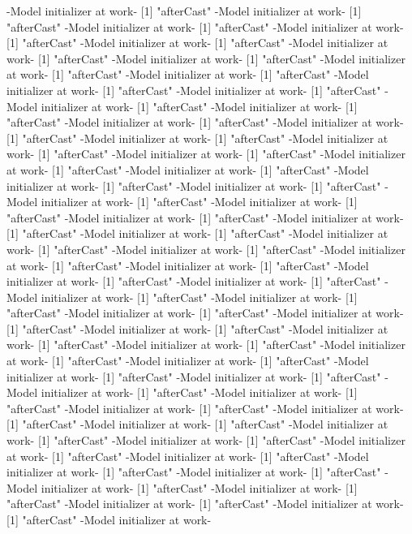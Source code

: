 \documentclass[a4paper]{article}
\begin{document}
\begin{Schunk}
\begin{Soutput}
-Model initializer at work-
[1] "afterCast"
-Model initializer at work-
[1] "afterCast"
-Model initializer at work-
[1] "afterCast"
-Model initializer at work-
[1] "afterCast"
-Model initializer at work-
[1] "afterCast"
-Model initializer at work-
[1] "afterCast"
-Model initializer at work-
[1] "afterCast"
-Model initializer at work-
[1] "afterCast"
-Model initializer at work-
[1] "afterCast"
-Model initializer at work-
[1] "afterCast"
-Model initializer at work-
[1] "afterCast"
-Model initializer at work-
[1] "afterCast"
-Model initializer at work-
[1] "afterCast"
-Model initializer at work-
[1] "afterCast"
-Model initializer at work-
[1] "afterCast"
-Model initializer at work-
[1] "afterCast"
-Model initializer at work-
[1] "afterCast"
-Model initializer at work-
[1] "afterCast"
-Model initializer at work-
[1] "afterCast"
-Model initializer at work-
[1] "afterCast"
-Model initializer at work-
[1] "afterCast"
-Model initializer at work-
[1] "afterCast"
-Model initializer at work-
[1] "afterCast"
-Model initializer at work-
[1] "afterCast"
-Model initializer at work-
[1] "afterCast"
-Model initializer at work-
[1] "afterCast"
-Model initializer at work-
[1] "afterCast"
-Model initializer at work-
[1] "afterCast"
-Model initializer at work-
[1] "afterCast"
-Model initializer at work-
[1] "afterCast"
-Model initializer at work-
[1] "afterCast"
-Model initializer at work-
[1] "afterCast"
-Model initializer at work-
[1] "afterCast"
-Model initializer at work-
[1] "afterCast"
-Model initializer at work-
[1] "afterCast"
-Model initializer at work-
[1] "afterCast"
-Model initializer at work-
[1] "afterCast"
-Model initializer at work-
[1] "afterCast"
-Model initializer at work-
[1] "afterCast"
-Model initializer at work-
[1] "afterCast"
-Model initializer at work-
[1] "afterCast"
-Model initializer at work-
[1] "afterCast"
-Model initializer at work-
[1] "afterCast"
-Model initializer at work-
[1] "afterCast"
-Model initializer at work-
[1] "afterCast"
-Model initializer at work-
[1] "afterCast"
-Model initializer at work-
[1] "afterCast"
-Model initializer at work-
[1] "afterCast"
-Model initializer at work-
[1] "afterCast"
-Model initializer at work-
[1] "afterCast"
-Model initializer at work-
[1] "afterCast"
-Model initializer at work-
[1] "afterCast"
-Model initializer at work-
[1] "afterCast"
-Model initializer at work-
[1] "afterCast"
-Model initializer at work-
[1] "afterCast"
-Model initializer at work-
[1] "afterCast"
-Model initializer at work-
[1] "afterCast"
-Model initializer at work-
[1] "afterCast"
-Model initializer at work-
[1] "afterCast"
-Model initializer at work-

\end{Soutput}
\end{Schunk}
\end{document}
